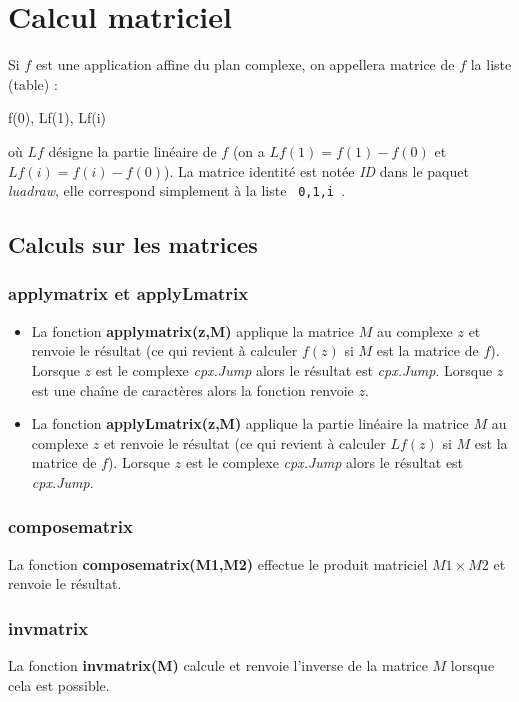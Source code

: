\section{Calcul matriciel}

Si $f$ est une application affine du plan complexe, on appellera matrice de $f$ la liste (table) :
\begin{Luacode}
{ f(0), Lf(1), Lf(i) }
\end{Luacode}
où $Lf$ désigne la partie linéaire de $f$ (on a $Lf(1) = f(1)-f(0)$ et $Lf(i)=f(i)-f(0)$). La matrice identité est notée \emph{ID} dans le paquet \emph{luadraw}, elle correspond simplement à la liste \texttt{ {0,1,i} }.

\subsection{Calculs sur les matrices}

\subsubsection{applymatrix et applyLmatrix}
\begin{itemize}
    \item La fonction \textbf{applymatrix(z,M)} applique la matrice $M$ au complexe $z$ et renvoie le résultat (ce qui revient à calculer $f(z)$ si $M$ est la matrice de $f$). Lorsque $z$ est le complexe \emph{cpx.Jump} alors le résultat est \emph{cpx.Jump}. Lorsque $z$ est une chaîne de caractères alors la fonction renvoie $z$.
    \item La fonction \textbf{applyLmatrix(z,M)} applique la partie linéaire la matrice $M$ au complexe $z$ et renvoie le résultat (ce qui revient à calculer $Lf(z)$ si $M$ est la matrice de $f$). Lorsque $z$ est le complexe \emph{cpx.Jump} alors le résultat est \emph{cpx.Jump}.
\end{itemize}

\subsubsection{composematrix}
La fonction \textbf{composematrix(M1,M2)} effectue le produit matriciel $M1\times M2$ et renvoie le résultat.

\subsubsection{invmatrix}
La fonction \textbf{invmatrix(M)} calcule et renvoie l'inverse de la matrice $M$ lorsque cela est possible.

